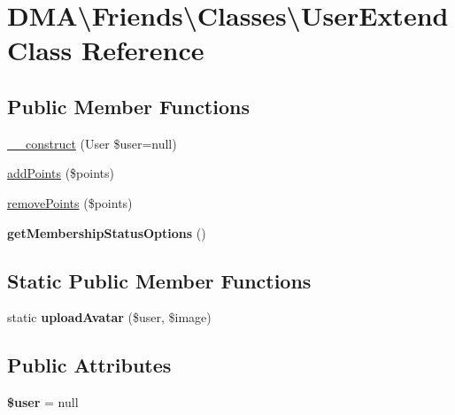 \hypertarget{classDMA_1_1Friends_1_1Classes_1_1UserExtend}{\section{D\+M\+A\textbackslash{}Friends\textbackslash{}Classes\textbackslash{}User\+Extend Class Reference}
\label{classDMA_1_1Friends_1_1Classes_1_1UserExtend}
}
\subsection*{Public Member Functions}
\begin{DoxyCompactItemize}
\item 
\hyperlink{classDMA_1_1Friends_1_1Classes_1_1UserExtend_aa399d503ccb972cb46171bd7cc2fbadf}{\+\_\+\+\_\+construct} (User \$user=null)
\item 
\hyperlink{classDMA_1_1Friends_1_1Classes_1_1UserExtend_ae2d0cddf99425d8ffbe2ed2c74372024}{add\+Points} (\$points)
\item 
\hyperlink{classDMA_1_1Friends_1_1Classes_1_1UserExtend_a452030297bbe4f11bb8452e4d57396cd}{remove\+Points} (\$points)
\item 
\hypertarget{classDMA_1_1Friends_1_1Classes_1_1UserExtend_ac1de8e9326eaa1466503bf34fa0a3748}{{\bfseries get\+Membership\+Status\+Options} ()}\label{classDMA_1_1Friends_1_1Classes_1_1UserExtend_ac1de8e9326eaa1466503bf34fa0a3748}

\end{DoxyCompactItemize}
\subsection*{Static Public Member Functions}
\begin{DoxyCompactItemize}
\item 
\hypertarget{classDMA_1_1Friends_1_1Classes_1_1UserExtend_a0052edba29ca35647646bd33a05d9ccf}{static {\bfseries upload\+Avatar} (\$user, \$image)}\label{classDMA_1_1Friends_1_1Classes_1_1UserExtend_a0052edba29ca35647646bd33a05d9ccf}

\end{DoxyCompactItemize}
\subsection*{Public Attributes}
\begin{DoxyCompactItemize}
\item 
\hypertarget{classDMA_1_1Friends_1_1Classes_1_1UserExtend_ab5502f589b8c00f7a847a3ebece55281}{{\bfseries \$user} = null}\label{classDMA_1_1Friends_1_1Classes_1_1UserExtend_ab5502f589b8c00f7a847a3ebece55281}

\end{DoxyCompactItemize}


